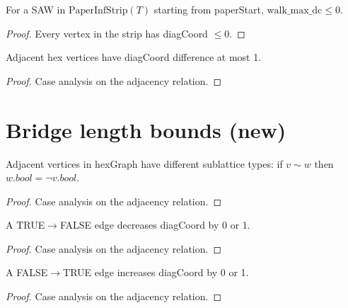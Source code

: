 \begin{lemma}
\begin{enumerate}
\begin{lemma}
\label{lem:strip-walk-max-dc}
\leanok
  For a SAW in $\text{PaperInfStrip}(T)$ starting from paperStart,
  $\text{walk\_max\_dc} \leq 0$.
\end{lemma}
\begin{proof}
\leanok
  Every vertex in the strip has diagCoord $\leq 0$.
\end{proof}

\begin{lemma}
\label{lem:hex-adj-diagcoord}
\leanok
  Adjacent hex vertices have diagCoord difference at most 1.
\end{lemma}
\begin{proof}
\leanok
  Case analysis on the adjacency relation.
\end{proof}

\section{Bridge length bounds (new)}

\begin{lemma}[Bipartiteness]
\label{lem:bipartite}
\leanok
  Adjacent vertices in hexGraph have different sublattice types:
  if $v \sim w$ then $w.\mathit{bool} = \lnot v.\mathit{bool}$.
\end{lemma}
\begin{proof}
\leanok
  Case analysis on the adjacency relation.
\end{proof}

\begin{lemma}
\label{lem:true-false-dc}
\leanok
  A TRUE$\to$FALSE edge decreases diagCoord by 0 or 1.
\end{lemma}
\begin{proof}
\leanok
  Case analysis on the adjacency relation.
\end{proof}

\begin{lemma}
\label{lem:false-true-dc}
\leanok
  A FALSE$\to$TRUE edge increases diagCoord by 0 or 1.
\end{lemma}
\begin{proof}
\leanok
  Case analysis on the adjacency relation.
\end{proof}


\end{enumerate}
\end{lemma}
